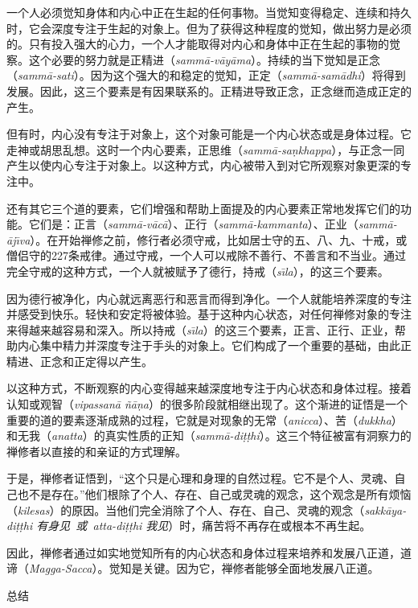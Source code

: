 一个人必须觉知身体和内心中正在生起的任何事物。当觉知变得稳定、连续和持久时，它会深度专注于生起的对象上。但为了获得这种程度的觉知，做出努力是必须的。只有投入强大的心力，一个人才能取得对内心和身体中正在生起的事物的觉察。这个必要的努力就是正精进（{\it samm\=a-v\=ay\=ama}）。持续的当下觉知是正念（{\it samm\=a-sati}）。因为这个强大的和稳定的觉知，正定（{\it samm\=a-sam\=adhi}）将得到发展。因此，这三个要素是有因果联系的。正精进导致正念，正念继而造成正定的产生。

但有时，内心没有专注于对象上，这个对象可能是一个内心状态或是身体过程。它走神或胡思乱想。这时一个内心要素，正思维（{\it samm\=a-sa\d nkhappa}），与正念一同产生以使内心专注于对象上。以这种方式，内心被带入到对它所观察对象更深的专注中。

还有其它三个道的要素，它们增强和帮助上面提及的内心要素正常地发挥它们的功能。它们是：正言（{\it samm\=a-v\=ac\=a}）、正\1行（{\it samm\=a-kammanta}）、正业（{\it samm\=a-\=aj\=\i va}）。在开始禅修之前，修行者必须守戒，比如居士守的五、八、九、十戒，或僧侣守的227条戒律。通过守戒，一个人可以戒除不善行、不善言和不当业。通过完全守戒的这种方式，一个人就被赋予了德行，持戒（{\it s\=\i la}），的这三个要素。

因为德行被净化，内心就远离恶行和恶言而得到净化。一个人就能培养深度的专注并感受到快乐。轻快和安定将被体验。基于这种内心状态，对任何禅修对象的专注来得越来越容易和深入。所以持戒（{\it s\=\i la}）的这三个要素，正言、正行、正业，帮助内心集中精力并深度专注于手头的对象上。它们构成了一个重要的基础，由此正精进、正念和正定得以产生。

以这种方式，不断观察的内心变得越来越深度地专注于内心状态和身体过程。接着认知或观智（{\it vipassan\=a \~n\=a\d na}）的很多阶段就相继出现了。这个渐进的证悟是一个重要的道的要素逐渐成熟的过程，它就是对现象的无常（{\it anicca}）、苦（{\it dukkha}）和无我（{\it anatta}）的真实性质的正知（{\it samm\=a-di\d t\d thi}）。这三个特征被富有洞察力的禅修者以直接的和亲证的方式理解。

于是，禅修者证悟到，“这个只是心理和身理的自然过程。它不是个人、灵魂、自己也不是存在。”他们根除了\1个人、存在、自己或灵魂的观念，这个观念是所有烦恼（{\it kilesas}）的原因。当他们完全消除了个人、存在、自己、灵魂的观念（{\it sakk\=aya-di\d t\d thi 有身见\ 或\ atta-di\d t\d thi 我见}）时，痛苦将不再存在或根本不再生起。

因此，禅修者通过如实地觉知所有的内心状态和身体过程来培养和发展八正道，道谛（{\it Magga-Sacca}）。觉知是关键。因为它，禅修者能够全面地发展八正道。

\sssubsectnonb 总结

